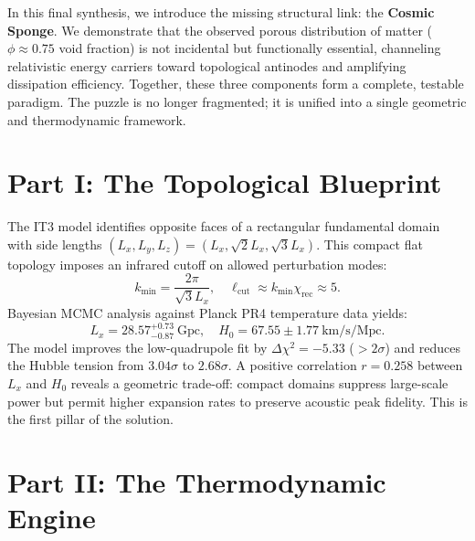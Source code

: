 \documentclass[12pt,a4paper]{article}
\begin{document}
In this final synthesis, we introduce the missing structural link: the \textbf{Cosmic Sponge}. We demonstrate that the observed porous distribution of matter ($\phi \approx 0.75$ void fraction) is not incidental but functionally essential, channeling relativistic energy carriers toward topological antinodes and amplifying dissipation efficiency. Together, these three components form a complete, testable paradigm. The puzzle is no longer fragmented; it is unified into a single geometric and thermodynamic framework.

\section{Part I: The Topological Blueprint}

The IT3 model identifies opposite faces of a rectangular fundamental domain with side lengths $(L_x, L_y, L_z) = (L_x, \sqrt{2}L_x, \sqrt{3}L_x)$. This compact flat topology imposes an infrared cutoff on allowed perturbation modes:
\begin{equation}
k_{\min} = \frac{2\pi}{\sqrt{3}L_x}, \quad \ell_{\text{cut}} \approx k_{\min} \chi_{\text{rec}} \approx 5.
\end{equation}
Bayesian MCMC analysis against Planck PR4 temperature data yields:
\begin{equation}
L_x = 28.57^{+0.73}_{-0.87}~\text{Gpc}, \quad H_0 = 67.55 \pm 1.77~\text{km/s/Mpc}.
\end{equation}
The model improves the low-quadrupole fit by $\Delta\chi^2 = -5.33$ ($>2\sigma$) and reduces the Hubble tension from $3.04\sigma$ to $2.68\sigma$. A positive correlation $r = 0.258$ between $L_x$ and $H_0$ reveals a geometric trade-off: compact domains suppress large-scale power but permit higher expansion rates to preserve acoustic peak fidelity. This is the first pillar of the solution.

\section{Part II: The Thermodynamic Engine}
\end{document}
